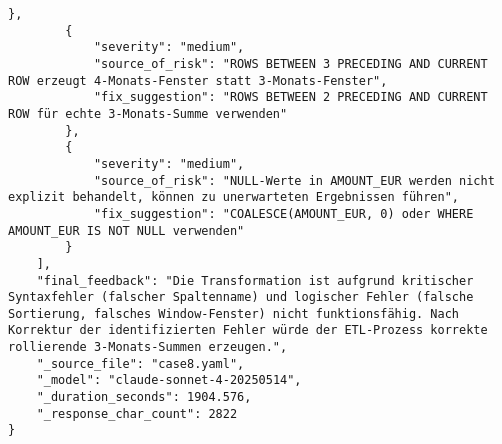 \begin{lstlisting}[caption={Ausgabe: Claude Sonnet 4 Anwendungsfall 8 Konsistenzdurchlauf},label={claude_case8_prompt2}]
        },
        {
            "severity": "medium",
            "source_of_risk": "ROWS BETWEEN 3 PRECEDING AND CURRENT ROW erzeugt 4-Monats-Fenster statt 3-Monats-Fenster",
            "fix_suggestion": "ROWS BETWEEN 2 PRECEDING AND CURRENT ROW für echte 3-Monats-Summe verwenden"
        },
        {
            "severity": "medium",
            "source_of_risk": "NULL-Werte in AMOUNT_EUR werden nicht explizit behandelt, können zu unerwarteten Ergebnissen führen",
            "fix_suggestion": "COALESCE(AMOUNT_EUR, 0) oder WHERE AMOUNT_EUR IS NOT NULL verwenden"
        }
    ],
    "final_feedback": "Die Transformation ist aufgrund kritischer Syntaxfehler (falscher Spaltenname) und logischer Fehler (falsche Sortierung, falsches Window-Fenster) nicht funktionsfähig. Nach Korrektur der identifizierten Fehler würde der ETL-Prozess korrekte rollierende 3-Monats-Summen erzeugen.",
    "_source_file": "case8.yaml",
    "_model": "claude-sonnet-4-20250514",
    "_duration_seconds": 1904.576,
    "_response_char_count": 2822
}
\end{lstlisting}

